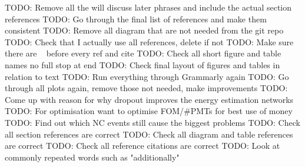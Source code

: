 TODO: Remove all the will discuss later phrases and include the actual section references
TODO: Go through the final list of references and make them consistent
TODO: Remove all diagram that are not needed from the git repo
TODO: Check that I actually use all references, delete if not
TODO: Make sure there are ~ before every ref and cite
TODO: Check all short figure and table names no full stop at end
TODO: Check final layout of figures and tables in relation to text
TODO: Run everything through Grammarly again
TODO: Go through all plots again, remove those not needed, make improvements
TODO: Come up with reason for why dropout improves the energy estimation networks
TODO: For optimisation want to optimise FOM/#PMTs for best use of money
TODO: Find out which NC events still cause the biggest problems
TODO: Check all section references are correct
TODO: Check all diagram and table references are correct
TODO: Check all reference citations are correct
TODO: Look at commonly repeated words such as "additionally"